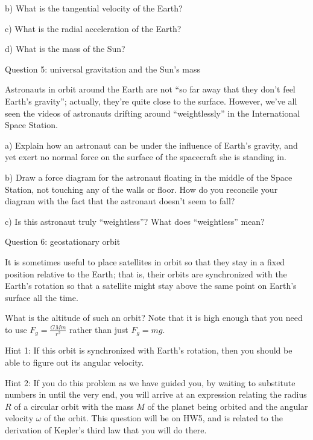 \documentclass[12pt]{article}
\begin{document}
b) What is the tangential velocity of the Earth? 

\vspace{1in}

c) What is the radial acceleration of the Earth?

\vspace{1in}

d) What is the mass of the Sun?

\newpage

\centerline{\Large Question 5: universal gravitation and the Sun's mass}

Astronauts in orbit around the Earth are not ``so far away that they don't feel Earth's gravity'';
actually, they’re quite close to the surface. However, we’ve all seen the videos of astronauts drifting
around ``weightlessly'' in the International Space Station.

a) Explain how an astronaut can be under the influence of Earth's gravity, and yet exert no normal
force on the surface of the spacecraft she is standing in.

\vspace{2in}

b) Draw a force diagram for the astronaut floating in the middle of the Space Station, not touching
any of the walls or floor. How do you reconcile your diagram with the fact that the astronaut
doesn't seem to fall?

\vspace{2in}

c) Is this astronaut truly ``weightless''? What does ``weightless'' mean?

\newpage

\centerline{\Large Question 6: geostationary orbit}

It is sometimes useful to place satellites in orbit so that they stay in a fixed position relative to the
Earth; that is, their orbits are synchronized with the Earth's rotation so that a satellite might stay
above the same point on Earth’s surface all the time.

What is the altitude of such an orbit? Note that it is high enough that you need to use $F_g=\frac{GMm}{r^2}$
rather than just $F_g = mg$.

{\sc Hint 1:} If this orbit is synchronized with Earth's rotation, then you should be able to figure out its
angular velocity.

{\sc Hint 2:} If you do this problem as we have guided you, by waiting to substitute numbers in until the 
very end, you will arrive at an expression relating the radius $R$ of a circular orbit with the mass $M$ of the 
planet being orbited and the angular velocity $\omega$ of the orbit. This question will be on HW5, and is related
to the derivation of Kepler's third law that you will do there.
\end{document}
